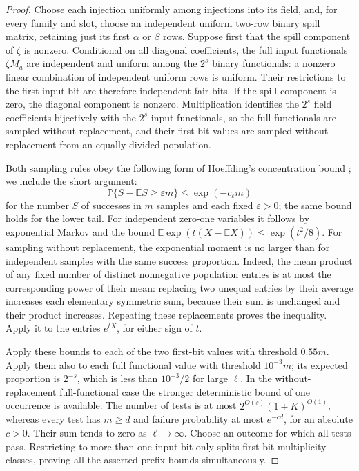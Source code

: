 \begin{proof}
Choose each injection uniformly among injections into its field, and,
for every family and slot, choose an independent uniform two-row
binary spill matrix, retaining just its first \(\alpha\) or \(\beta\)
rows.  Suppose first that the spill component of \(\zeta\) is
nonzero.  Conditional on all diagonal coefficients, the full input
functionals \(\zeta M_a\) are independent and uniform among the
\(2^s\) binary functionals: a nonzero linear combination of independent
uniform rows is uniform.  Their restrictions to the first input bit
are therefore independent fair bits.  If the spill component is zero,
the diagonal component is nonzero.  Multiplication identifies the
\(2^s\) field coefficients bijectively with the \(2^s\) input
functionals, so the full functionals are sampled without replacement,
and their first-bit values are sampled without replacement from an
equally divided population.

Both sampling rules obey the following form of Hoeffding's concentration
bound \cite{Hoeffding1963}; we include the short argument:
\[
 \mathbb P\{S-\mathbb ES\geq \varepsilon m\}
       \leq \exp(-c_\varepsilon m)
\]
for the number \(S\) of successes in \(m\) samples and each fixed
\(\varepsilon>0\); the same bound holds for the lower tail.
For independent zero-one variables it follows by exponential Markov
and the bound
\(\mathbb E\exp(t(X-\mathbb EX))\leq\exp(t^2/8)\).
For sampling without replacement, the exponential moment is no larger
than for independent samples with the same success proportion.  Indeed,
the mean product of any fixed number of distinct nonnegative population
entries is at most the corresponding power of their mean: replacing
two unequal entries by their average increases each elementary
symmetric sum, because their sum is unchanged and their product
increases.  Repeating these replacements proves the inequality.
Apply it to the entries \(e^{tX}\), for either sign of \(t\).

Apply these bounds to each of the two first-bit values with threshold
\(0.55m\).  Apply them also to each full functional value with
threshold \(10^{-3}m\); its expected proportion is \(2^{-s}\),
which is less than \(10^{-3}/2\) for large \(\ell\).  In the
without-replacement full-functional case the stronger deterministic
bound of one occurrence is available.  The number of tests is at most
\(2^{O(s)}(1+K)^{O(1)}\), whereas every test has
\(m\geq d\) and failure probability at most \(e^{-cd}\), for
an absolute \(c>0\).  Their sum tends to zero as \(\ell\to\infty\).
Choose an outcome for which all tests pass.  Restricting to more than
one input bit only splits first-bit multiplicity classes, proving all
the asserted prefix bounds simultaneously.
\end{proof}

